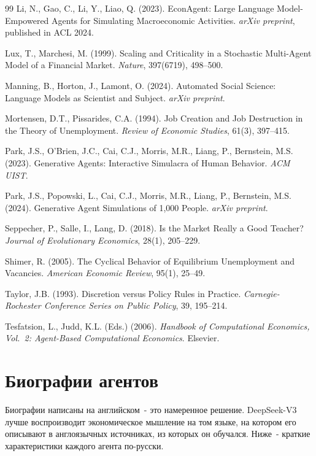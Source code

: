 \documentclass[12pt, a4paper]{article}
\begin{document}
\begin{thebibliography}{99}
Li, N., Gao, C., Li, Y., Liao, Q. (2023).
EconAgent: Large Language Model-Empowered Agents for Simulating Macroeconomic Activities.
\textit{arXiv preprint}, published in ACL 2024.

Lux, T., Marchesi, M. (1999).
Scaling and Criticality in a Stochastic Multi-Agent Model of a Financial Market.
\textit{Nature}, 397(6719), 498--500.

Manning, B., Horton, J., Lamont, O. (2024).
Automated Social Science: Language Models as Scientist and Subject.
\textit{arXiv preprint}.

Mortensen, D.T., Pissarides, C.A. (1994).
Job Creation and Job Destruction in the Theory of Unemployment.
\textit{Review of Economic Studies}, 61(3), 397--415.

Park, J.S., O'Brien, J.C., Cai, C.J., Morris, M.R., Liang, P., Bernstein, M.S. (2023).
Generative Agents: Interactive Simulacra of Human Behavior.
\textit{ACM UIST}.

Park, J.S., Popowski, L., Cai, C.J., Morris, M.R., Liang, P., Bernstein, M.S. (2024).
Generative Agent Simulations of 1,000 People.
\textit{arXiv preprint}.

Seppecher, P., Salle, I., Lang, D. (2018).
Is the Market Really a Good Teacher?
\textit{Journal of Evolutionary Economics}, 28(1), 205--229.

Shimer, R. (2005).
The Cyclical Behavior of Equilibrium Unemployment and Vacancies.
\textit{American Economic Review}, 95(1), 25--49.

Taylor, J.B. (1993).
Discretion versus Policy Rules in Practice.
\textit{Carnegie-Rochester Conference Series on Public Policy}, 39, 195--214.

Tesfatsion, L., Judd, K.L. (Eds.) (2006).
\textit{Handbook of Computational Economics, Vol.~2: Agent-Based Computational Economics}.
Elsevier.

\end{thebibliography}

\appendix

\section{Биографии агентов}

Биографии написаны на английском~- это намеренное решение. DeepSeek-V3 лучше воспроизводит экономическое мышление на том языке, на котором его описывают в англоязычных источниках, из которых он обучался. Ниже~- краткие характеристики каждого агента по-русски.
\end{document}
